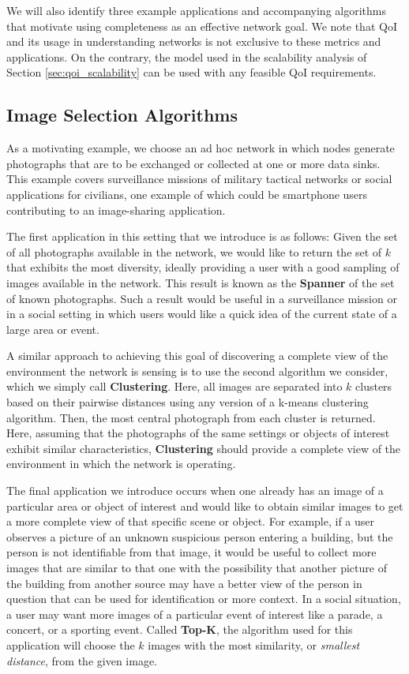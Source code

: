 We will also identify three example applications and accompanying algorithms that motivate using completeness as an effective network goal.  We note that QoI and its usage in understanding networks is not exclusive to these metrics and applications.  On the contrary, the model used in the scalability analysis of Section \ref{sec:qoi_scalability} can be used with any feasible QoI requirements.

\subsection{Image Selection Algorithms}

As a motivating example, we choose an ad hoc network in which nodes generate photographs that are to be exchanged or collected at one or more data sinks.  This example covers surveillance missions of military tactical networks or social applications for civilians, one example of which could be smartphone users contributing to an image-sharing application. 

The first application in this setting that we introduce is as follows:  Given the set of all photographs available in the network, we would like to return the set of $k$ that exhibits the most diversity, ideally providing a user with a good sampling of images available in the network.  This result is known as the {\bf Spanner} of the set of known photographs.  Such a result would be useful in a surveillance mission or in a social setting in which users would like a quick idea of the current state of a large area or event.  

A similar approach to achieving this goal of discovering a complete view of the environment the network is sensing is to use the second algorithm we consider, which we simply call {\bf Clustering}.  Here, all images are separated into $k$ clusters based on their pairwise distances using any version of a k-means clustering algorithm.  Then, the most central photograph from each cluster is returned.  Here, assuming that the photographs of the same settings or objects of interest exhibit similar characteristics, {\bf Clustering} should provide a complete view of the environment in which the network is operating.

The final application we introduce occurs when one already has an image of a particular area or object of interest and would like to obtain similar images to get a more complete view of that specific scene or object.  For example, if a user observes a picture of an unknown suspicious person entering a building, but the person is not identifiable from that image, it would be useful to collect more images that are similar to that one with the possibility that another picture of the building from another source may have a better view of the person in question that can be used for identification or more context.  In a social situation, a user may want more images of a particular event of interest like a parade, a concert, or a sporting event.  Called {\bf Top-K}, the algorithm used for this application will choose the $k$ images with the most similarity, or \emph{smallest distance}, from the given image.  


